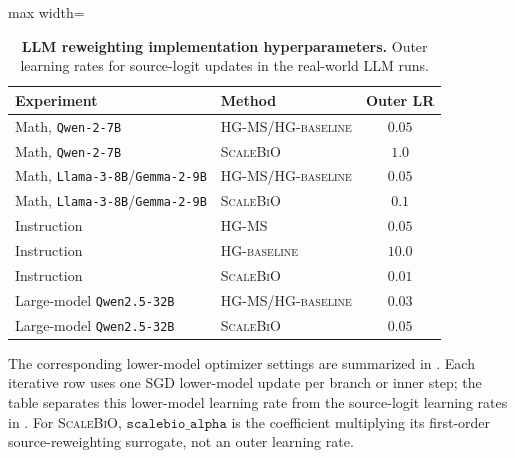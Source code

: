 \documentclass{article}
\theoremstyle{normaltheorem}
\begin{document}
\begin{table}[t]
  \centering
  \caption{\textbf{LLM reweighting implementation hyperparameters.}
  Outer learning rates for source-logit updates in the real-world LLM runs.}
  \label{tab:llm-implementation-hparams}
  \begin{adjustbox}{max width=\linewidth}
  \begin{tabular}{llc}
    \toprule
    Experiment & Method & Outer LR \\
    \midrule
    Math, \texttt{Qwen-2-7B} & \textsc{HG-MS}/\textsc{HG-baseline} & \(0.05\) \\
    Math, \texttt{Qwen-2-7B} & \textsc{ScaleBiO} & \(1.0\) \\
    Math, \texttt{Llama-3-8B}/\texttt{Gemma-2-9B} & \textsc{HG-MS}/\textsc{HG-baseline} & \(0.05\) \\
	Math, \texttt{Llama-3-8B}/\texttt{Gemma-2-9B} & \textsc{ScaleBiO} & \(0.1\) \\
    Instruction & \textsc{HG-MS} & \(0.05\) \\
    Instruction & \textsc{HG-baseline} & \(10.0\) \\
    Instruction & \textsc{ScaleBiO} & \(0.01\) \\
    Large-model \texttt{Qwen2.5-32B} & \textsc{HG-MS}/\textsc{HG-baseline}	 & \(0.03\) \\
    Large-model \texttt{Qwen2.5-32B} & \textsc{ScaleBiO} & \(0.05\) \\
    \bottomrule
  \end{tabular}
  \end{adjustbox}
\end{table}

The corresponding lower-model optimizer settings are summarized in . Each iterative row
uses one SGD lower-model update per branch or inner step; the table separates this lower-model learning rate from the
source-logit learning rates in . For \textsc{ScaleBiO},
\(\texttt{scalebio\_alpha}\) is the coefficient multiplying its first-order source-reweighting surrogate, not an outer
learning rate.
\end{document}
